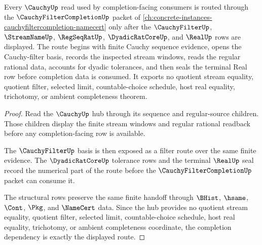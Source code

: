 \begin{theorem}
\label{thm:cauchy-orphan-filter-completion-dependency-route}
Every $\CauchyUp$ read used by completion-facing consumers is routed through the $\CauchyFilterCompletionUp$ packet of \autoref{ch:concrete-instances-cauchyfiltercompletion-namecert} only after the $\CauchyFilterUp$, $\StreamNameUp$, $\RegSeqRatUp$, $\DyadicRatCoreUp$, and $\RealUp$ rows are displayed. The route begins with finite Cauchy sequence evidence, opens the Cauchy-filter basis, records the inspected stream windows, reads the regular rational data, accounts for dyadic tolerances, and then seals the terminal Real row before completion data is consumed. It exports no quotient stream equality, quotient filter, selected limit, countable-choice schedule, host real equality, trichotomy, or ambient completeness theorem.
\end{theorem}
\begin{proof}
Read the $\CauchyUp$ hub through its sequence and regular-source children. Those children display the finite stream windows and regular rational readback before any completion-facing row is available.

The $\CauchyFilterUp$ basis is then exposed as a filter route over the same finite evidence. The $\DyadicRatCoreUp$ tolerance rows and the terminal $\RealUp$ seal record the numerical part of the route before the $\CauchyFilterCompletionUp$ packet can consume it.

The structural rows preserve the same finite handoff through $\BHist$, $\hsame$, $\Cont$, $\Pkg$, and $\NameCert$ data. Since the hub provides no quotient stream equality, quotient filter, selected limit, countable-choice schedule, host real equality, trichotomy, or ambient completeness coordinate, the completion dependency is exactly the displayed route.
\end{proof}
